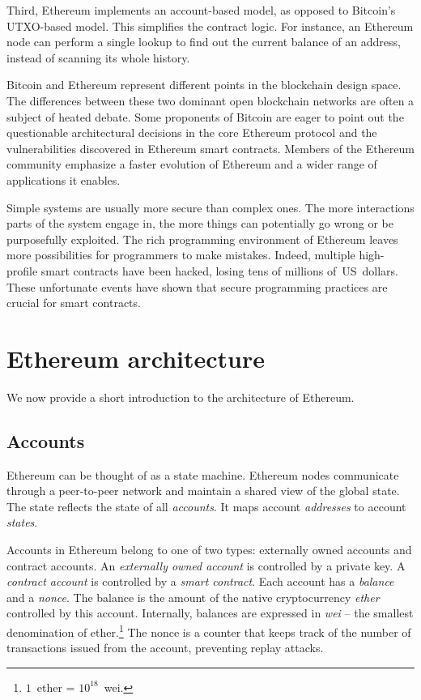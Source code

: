 Third, Ethereum implements an account-based model, as opposed to Bitcoin's UTXO-based model.
This simplifies the contract logic.
For instance, an Ethereum node can perform a single lookup to find out the current balance of an address, instead of scanning its whole history.

Bitcoin and Ethereum represent different points in the blockchain design space.
The differences between these two dominant open blockchain networks are often a subject of heated debate.
Some proponents of Bitcoin are eager to point out the questionable architectural decisions in the core Ethereum protocol and the vulnerabilities discovered in Ethereum smart contracts.
Members of the Ethereum community emphasize a faster evolution of Ethereum and a wider range of applications it enables.

Simple systems are usually more secure than complex ones.
The more interactions parts of the system engage in, the more things can potentially go wrong or be purposefully exploited.
The rich programming environment of Ethereum leaves more possibilities for programmers to make mistakes.
Indeed, multiple high-profile smart contracts have been hacked, losing tens of millions of~US~dollars.
These unfortunate events have shown that secure programming practices are crucial for smart contracts.


\section{Ethereum architecture}

We now provide a short introduction to the architecture of Ethereum.

\subsection{Accounts}

Ethereum can be thought of as a state machine.
Ethereum nodes communicate through a peer-to-peer network and maintain a shared view of the global state.
The state reflects the state of all \textit{accounts}.
It maps account \textit{addresses} to account \textit{states}.

Accounts in Ethereum belong to one of two types: externally owned accounts and contract accounts.
An \textit{externally owned account} is controlled by a private key.
A \textit{contract account} is controlled by a \textit{smart contract}.
Each account has a \textit{balance} and a \textit{nonce}.
The balance is the amount of the native cryptocurrency \textit{ether} controlled by this account.
Internally, balances are expressed in \textit{wei} -- the smallest denomination of ether.\footnote{$1$~ether = $10^{18}$~wei.}
The nonce is a counter that keeps track of the number of transactions issued from the account, preventing replay attacks.

